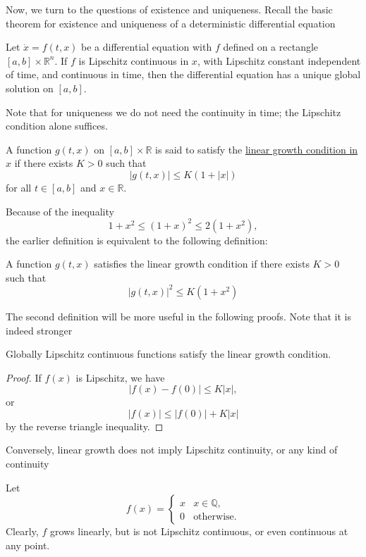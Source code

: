 \documentclass[prb,12pt]{revtex4-2}
\theoremstyle{definition}
\theoremstyle{definition}
\theoremstyle{definition}
\newcommand{\R}{\mathbb{R}}
\newcommand{\Q}{\mathbb{Q}}
\begin{document}
Now, we turn to the questions of existence and uniqueness. Recall the basic theorem for existence and uniqueness of a deterministic differential equation
\begin{Theorem}
	Let $\dot{x} = f(t,x)$ be a differential equation with $f$ defined on a rectangle $[a,b]\times \R^n$. If $f$ is Lipschitz continuous in $x$, with Lipschitz constant independent of time, and continuous in time, then the differential equation has a unique global solution on $[a,b]$.
\end{Theorem}
Note that for uniqueness we do not need the continuity in time; the Lipschitz condition alone suffices.
\begin{Definition}
	A function $g(t, x)$ on $[a,b]\times \R$ is said to satisfy the \uline{linear growth condition in $x$} if there exists $K>0$ such that
	\[|g(t, x)|\le K(1+|x|)\]
	for all $t\in [a,b]$ and $x\in \R$.
\end{Definition}
Because of the inequality
\[1+x^2 \le (1+x)^2 \le 2(1+x^2),\]
the earlier definition is equivalent to the following definition:
\begin{Proposition}
	A function $g(t,x)$ satisfies the linear growth condition if there exists $K>0$ such that
	\[|g(t,x)|^2 \le K(1+x^2)\]
\end{Proposition}
The second definition will be more useful in the following proofs. Note that it is indeed stronger
\begin{Proposition}
	Globally Lipschitz continuous functions satisfy the linear growth condition.
\end{Proposition}
\begin{proof}
If $f(x)$ is Lipschitz, we have
\[|f(x) - f(0)| \le K |x|,\]
or
\[|f(x)|\le |f(0)| + K|x|\]
by the reverse triangle inequality.
\end{proof}
Conversely, linear growth does not imply Lipschitz continuity, or any kind of continuity
\begin{Example}
	Let
	\[f(x) = \begin{cases}
		x & x\in \Q,\\
		0 & \text{otherwise}.
	\end{cases}\]
	Clearly, $f$ grows linearly, but is not Lipschitz continuous, or even continuous at any point.
\end{Example}
\end{document}
